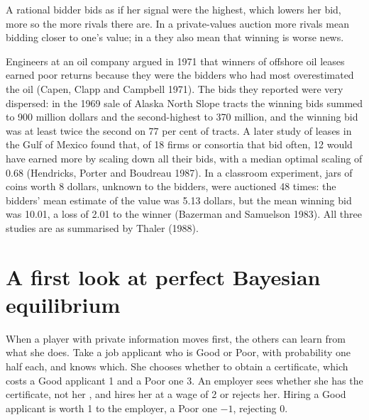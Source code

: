 A rational bidder bids as if her signal were the highest, which lowers her bid, more so the more rivals there are. In a
private-values auction more rivals mean bidding closer to one's value; in a  they also mean that
winning is worse news.

\begin{record}
Engineers at an oil company argued in 1971 that winners of offshore oil leases earned poor returns because they were the
bidders who had most overestimated the oil (Capen, Clapp and Campbell 1971). The bids they reported were very dispersed: in
the 1969 sale of Alaska North Slope tracts the winning bids summed to 900 million dollars and the second-highest to 370
million, and the winning bid was at least twice the second on 77 per cent of tracts. A later study of leases in the Gulf
of Mexico found that, of 18 firms or consortia that bid often, 12 would have earned more by scaling down all their bids,
with a median optimal scaling of 0.68 (Hendricks, Porter and Boudreau 1987). In a classroom experiment, jars of coins worth
8 dollars, unknown to the bidders, were auctioned 48 times: the bidders' mean estimate of the value was 5.13 dollars, but
the mean winning bid was 10.01, a loss of 2.01 to the winner (Bazerman and Samuelson 1983). All three studies are as
summarised by Thaler (1988).
\end{record}

\section{A first look at perfect Bayesian equilibrium}\label{sec:b2:bayesian-games:pbe}

When a player with private information moves first, the others can learn from what she does. Take a job applicant
who is Good or Poor, with probability one half each, and knows which. She chooses whether to obtain a certificate,
which costs a Good applicant 1 and a Poor one 3. An employer sees whether she has the certificate, not her , and
hires her at a wage of 2 or rejects her. Hiring a Good applicant is worth 1 to the employer, a Poor one $-1$, rejecting
0.

